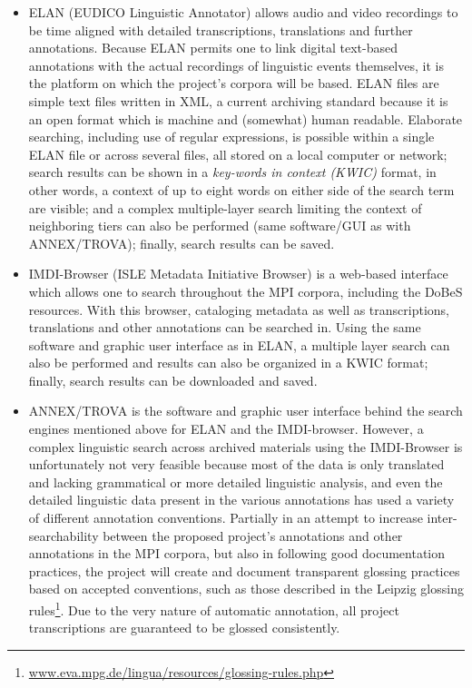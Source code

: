 \documentclass[a4paper,12pt]{article}
\begin{document}
\begin{itemize}
\item ELAN (EUDICO Linguistic Annotator) allows audio and video recordings to be time aligned with detailed transcriptions, translations and further annotations. Because ELAN permits one to link digital text-based annotations with the actual recordings of linguistic events themselves, it is the platform on which the project's corpora will be based. ELAN files are simple text files written in XML, a current archiving standard because it is an open format which is machine and (somewhat) human readable. Elaborate searching, including use of regular expressions, is possible within a single ELAN file or across several files, all stored on a local computer or network; search results can be shown in a \textit{key-words in context (KWIC)} format, in other words, a context of up to eight words on either side of the search term are visible; and a complex multiple-layer search limiting the context of neighboring tiers can also be performed (same software/GUI as with ANNEX/TROVA); finally, search results can be saved.
\item IMDI-Browser (ISLE Metadata Initiative Browser) is a web-based interface which allows one to search throughout the MPI corpora, including the DoBeS resources. With this browser, cataloging metadata as well as transcriptions, translations and other annotations can be searched in. Using the same software and graphic user interface as in ELAN, a multiple layer search can also be performed and results can also be organized in a KWIC format; finally, search results can be downloaded and saved.
\item ANNEX/TROVA is the software and graphic user interface behind the search engines mentioned above for ELAN and the IMDI-browser. However, a complex linguistic search across archived materials using the IMDI-Browser is unfortunately not very feasible because most of the data is only translated and lacking grammatical or more detailed linguistic analysis, and even the detailed linguistic data present in the various annotations has used a variety of different annotation conventions. Partially in an attempt to increase inter-searchability between the proposed project's annotations and other annotations in the MPI corpora, but also in following good documentation practices, the project will create and document transparent glossing practices based on accepted conventions, such as those described in the Leipzig glossing rules\footnote{\url{www.eva.mpg.de/lingua/resources/glossing-rules.php}}. Due to the very nature of automatic annotation, all project transcriptions are guaranteed to be glossed consistently.
\end{itemize}
\end{document}
